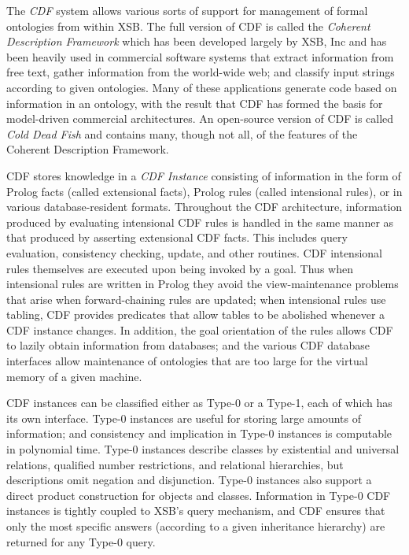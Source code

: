 The {\em CDF} system allows various sorts of support for management of
formal ontologies from within XSB.  The full version of CDF is called
the {\em Coherent Description Framework} which has been developed largely
by XSB, Inc and has been heavily used in commercial software systems
that extract information from free text, gather information from the
world-wide web; and classify input strings according to given
ontologies.  Many of these applications generate code based on
information in an ontology, with the result that CDF has formed the
basis for model-driven commercial architectures.  An open-source
version of CDF is called {\em Cold Dead Fish} and contains many,
though not all, of the features of the Coherent Description Framework.

CDF stores knowledge in a {\em CDF Instance} consisting of information
in the form of Prolog facts (called extensional facts), Prolog rules
(called intensional rules), or in various database-resident formats.
Throughout the CDF architecture, information produced by evaluating
intensional CDF rules is handled in the same manner as that produced
by asserting extensional CDF facts.  This includes query evaluation,
consistency checking, update, and other routines.  CDF intensional
rules themselves are executed upon being invoked by a goal.  Thus when
intensional rules are written in Prolog they avoid the
view-maintenance problems that arise when forward-chaining rules are
updated; when intensional rules use tabling, CDF provides predicates
that allow tables to be abolished whenever a CDF instance changes.  In
addition, the goal orientation of the rules allows CDF to lazily
obtain information from databases; and the various CDF database
interfaces allow maintenance of ontologies that are too large for the
virtual memory of a given machine.


CDF instances can be classified either as Type-0 or a Type-1, each of
which has its own interface.  Type-0 instances are useful for storing
large amounts of information; and consistency and implication in
Type-0 instances is computable in polynomial time.  Type-0 instances
describe classes by existential and universal relations, qualified
number restrictions, and relational hierarchies, but descriptions omit
negation and disjunction. Type-0 instances also support a direct
product construction for objects and classes.  
Information in Type-0 CDF instances is tightly coupled to XSB's
query mechanism, and CDF ensures that only the most specific answers
(according to a given inheritance hierarchy) are returned for any
Type-0 query.

